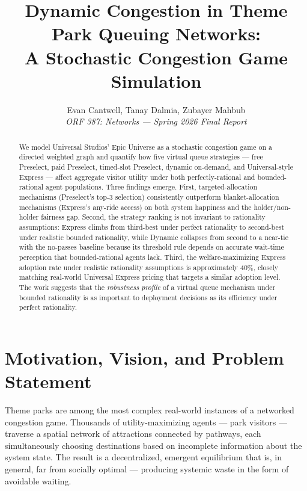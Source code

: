 \documentclass[11pt]{article}
\title{\textbf{Dynamic Congestion in Theme Park Queuing Networks:\\ A Stochastic Congestion Game Simulation}}
\author{Evan Cantwell, Tanay Dalmia, Zubayer Mahbub\\[4pt]\textit{ORF 387: Networks --- Spring 2026 Final Report}}
\date{}
\begin{document}
\maketitle

\begin{abstract}
\noindent We model Universal Studios' Epic Universe as a stochastic congestion game on a directed weighted graph and quantify how five virtual queue strategies --- free Preselect, paid Preselect, timed-slot Preselect, dynamic on-demand, and Universal-style Express --- affect aggregate visitor utility under both perfectly-rational and bounded-rational agent populations. Three findings emerge. First, targeted-allocation mechanisms (Preselect's top-3 selection) consistently outperform blanket-allocation mechanisms (Express's any-ride access) on both system happiness and the holder/non-holder fairness gap. Second, the strategy ranking is not invariant to rationality assumptions: Express climbs from third-best under perfect rationality to second-best under realistic bounded rationality, while Dynamic collapses from second to a near-tie with the no-passes baseline because its threshold rule depends on accurate wait-time perception that bounded-rational agents lack. Third, the welfare-maximizing Express adoption rate under realistic rationality assumptions is approximately 40\%, closely matching real-world Universal Express pricing that targets a similar adoption level. The work suggests that the \emph{robustness profile} of a virtual queue mechanism under bounded rationality is as important to deployment decisions as its efficiency under perfect rationality.
\end{abstract}

\section{Motivation, Vision, and Problem Statement}

Theme parks are among the most complex real-world instances of a networked congestion game. Thousands of utility-maximizing agents --- park visitors --- traverse a spatial network of attractions connected by pathways, each simultaneously choosing destinations based on incomplete information about the system state. The result is a decentralized, emergent equilibrium that is, in general, far from socially optimal --- producing systemic waste in the form of avoidable waiting.
\end{document}
